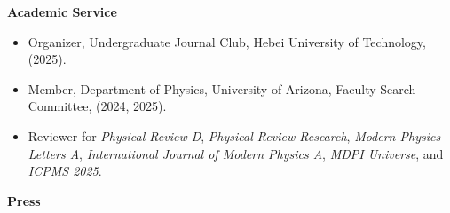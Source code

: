 \documentclass[11pt]{article}
\begin{document}
\medskip

{\Large\textbf{Academic Service}}

\begin{itemize}[leftmargin=*,nosep]
    \item Organizer, Undergraduate Journal Club, Hebei University of Technology, (2025).
    \item Member, Department of Physics, University of Arizona, Faculty Search Committee, (2024, 2025).
    \item Reviewer for \textit{Physical Review D}, \textit{Physical Review Research}, \textit{Modern Physics Letters A}, \textit{International Journal of Modern Physics A}, \textit{MDPI Universe}, and \textit{ICPMS 2025}.
\end{itemize}

\medskip

{\Large\textbf{Press}}
\end{document}
